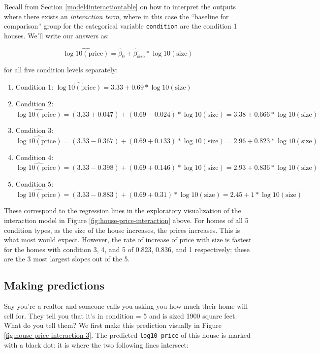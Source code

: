 \documentclass[12pt, krantz2,]{krantz}
\providecommand{\tightlist}{%
  \setlength{\itemsep}{0pt}\setlength{\parskip}{0pt}}
\begin{document}
Recall from Section \ref{model4interactiontable} on how to interpret the outputs where there exists an \emph{interaction term}, where in this case the ``baseline for comparison'' group for the categorical variable \texttt{condition} are the condition 1 houses. We'll write our answers as:

\[\widehat{\log10(\text{price})} = \hat{\beta}_0 + \hat{\beta}_{\text{size}} * \log10(\text{size})\]

for all five condition levels separately:

\begin{enumerate}
\def\labelenumi{\arabic{enumi}.}
\tightlist
\item
  Condition 1: \(\widehat{\log10(\text{price})} = 3.33 + 0.69 * \log10(\text{size})\)
\item
  Condition 2: \(\widehat{\log10(\text{price})} = (3.33 + 0.047) + (0.69 - 0.024) * \log10(\text{size}) = 3.38 + 0.666 * \log10(\text{size})\)
\item
  Condition 3: \(\widehat{\log10(\text{price})} = (3.33 - 0.367) + (0.69 + 0.133) * \log10(\text{size}) = 2.96 + 0.823 * \log10(\text{size})\)
\item
  Condition 4: \(\widehat{\log10(\text{price})} = (3.33 - 0.398) + (0.69 + 0.146) * \log10(\text{size}) = 2.93 + 0.836 * \log10(\text{size})\)
\item
  Condition 5: \(\widehat{\log10(\text{price})} = (3.33 - 0.883) + (0.69 + 0.31) * \log10(\text{size}) = 2.45 + 1 * \log10(\text{size})\)
\end{enumerate}

These correspond to the regression lines in the exploratory visualization of the interaction model in Figure \ref{fig:house-price-interaction} above. For homes of all 5 condition types, as the size of the house increases, the prices increases. This is what most would expect. However, the rate of increase of price with size is fastest for the homes with condition 3, 4, and 5 of 0.823, 0.836, and 1 respectively; these are the 3 most largest slopes out of the 5.

\hypertarget{house-prices-making-predictions}{%
\subsection{Making predictions}\label{house-prices-making-predictions}}

Say you're a realtor and someone calls you asking you how much their home will sell for. They tell you that it's in condition = 5 and is sized 1900 square feet. What do you tell them? We first make this prediction visually in Figure \ref{fig:house-price-interaction-3}. The predicted \texttt{log10\_price} of this house is marked with a black dot: it is where the two following lines intersect:
\end{document}
